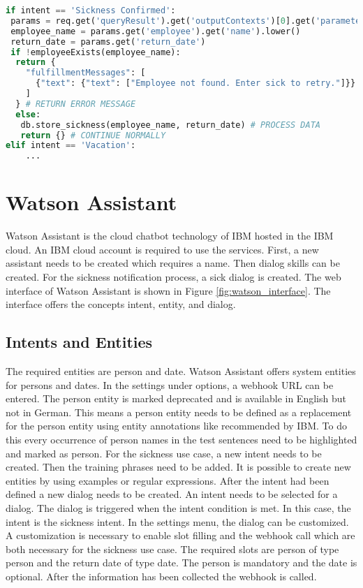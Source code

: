 \begin{lstlisting}[caption={Dialogflow Intent Handling}, label={lst:dialogflow_intent_handling},captionpos=b,frame=single,language={Python},commentstyle=\color{mygreen},keywordstyle=\color{blue},
    morekeywords={}]                
if intent == 'Sickness Confirmed':
 params = req.get('queryResult').get('outputContexts')[0].get('parameters')
 employee_name = params.get('employee').get('name').lower()
 return_date = params.get('return_date')
 if !employeeExists(employee_name):
  return {
    "fulfillmentMessages": [
      {"text": {"text": ["Employee not found. Enter sick to retry."]}}
    ]
  } # RETURN ERROR MESSAGE
  else:
   db.store_sickness(employee_name, return_date) # PROCESS DATA
   return {} # CONTINUE NORMALLY
elif intent == 'Vacation':
    ...
\end{lstlisting}  

\section{Watson Assistant}
Watson Assistant\citet{watsonassistant} is the cloud chatbot technology of IBM
hosted in the IBM cloud.
An IBM cloud account is required to use the services.
First, a new assistant needs to be created which requires a name.
Then dialog skills can be created.
For the sickness notification process, a sick dialog is created.
The web interface of Watson Assistant is shown in Figure \ref{fig:watson_interface}.
The interface offers the concepts intent, entity, and dialog.

\subsection{Intents and Entities}
The required entities are person and date.
Watson Assistant offers system entities for persons and dates.
In the settings under options, a webhook URL can be entered.
The person entity is marked deprecated and is available in English but not in German.
This means a person entity needs to be defined as a replacement for the person entity using entity annotations like recommended by IBM.
To do this every occurrence of person names in the test sentences need to be highlighted 
and marked as person.
For the sickness use case, a new intent needs to be created.
Then the training phrases need to be added.
It is possible to create new entities by using examples or regular expressions.
After the intent had been defined a new dialog needs to be created.
An intent needs to be selected for a dialog.
The dialog is triggered when the intent condition is met.
In this case, the intent is the sickness intent.
In the settings menu, the dialog can be customized.
A customization is necessary to enable slot filling and 
the webhook call which are both necessary for the sickness 
use case.
The required slots are person of type person and the return date of type date.
The person is mandatory and the date is optional.
After the information has been collected the webhook is called.


